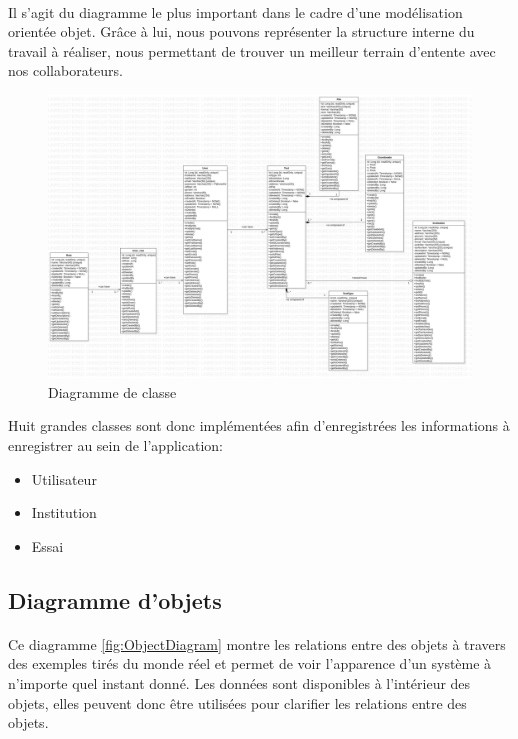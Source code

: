     \paragraph{}
    Il s'agit du diagramme le plus important dans le cadre 
    d'une modélisation orientée objet. Grâce à lui, nous pouvons
    représenter la structure interne du travail à réaliser, nous 
    permettant de trouver un meilleur terrain d'entente avec nos collaborateurs.
    \par 
    \begin{figure}[t]
        \centering
        \includegraphics[width=1\textwidth]{images/Analyse_des_besoins/ClassDiagram.png}
        \caption{Diagramme de classe}
        \label{fig:ClassDiagram}
    \end{figure}
    Huit grandes classes sont donc implémentées afin d'enregistrées les informations à enregistrer 
    au sein de l'application:
    \begin{itemize}
        \item Utilisateur
        \item Institution
        \item Essai 
    \end{itemize}
    \par 

    \subsection{Diagramme d'objets}
    \paragraph{}
    Ce diagramme \ref{fig:ObjectDiagram} montre les relations entre des objets à travers 
    des exemples tirés du monde réel et permet de voir 
    l'apparence d'un système à n'importe quel instant donné. 
    Les données sont disponibles à l'intérieur des objets, 
    elles peuvent donc être utilisées pour clarifier les 
    relations entre des objets.

